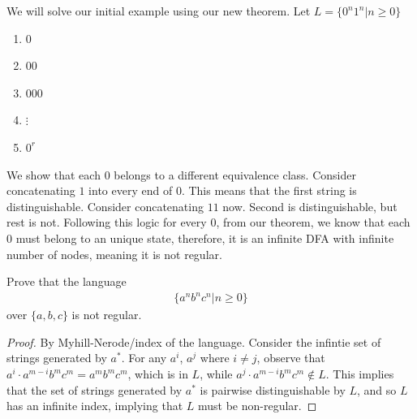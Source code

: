 \documentclass[a4paper]{article}
\theoremstyle{plain}
\theoremstyle{definition}
\newtheorem{exmp}{Example}[section]
\theoremstyle{remark}
\begin{document}
\begin{tcolorbox}[colback=black!3!white,colframe=black!60!white,title=\begin{exmp}Myhill-Nerode Example \label{Myhill-Nerode Example}\end{exmp}]
        We will solve our initial example using our new theorem. Let $L = \{0^{n}1^{n} | n \ge 0 \}$ 
	\begin{enumerate}
		\item $0$ 
		\item $00$ 
		\item $000$ 
		\item $\vdots$
		\item $0^{r}$
	\end{enumerate}
	We show that each $0$ belongs to a different equivalence class. Consider concatenating $1$ into every end of $ 0$. This means that the first string is distinguishable. Consider concatenating  $11$ now. Second is distinguishable, but rest is not. Following this logic for every $0$, from our theorem, we know that each $0$ must belong to an unique state, therefore, it is an infinite DFA with infinite number of nodes, meaning it is not regular.
\end{tcolorbox}
\begin{tcolorbox}[colback=black!3!white,colframe=black!60!white,title=\begin{exmp}Myhill-Nerode Example Two \label{Myhill-Nerode Example Two}\end{exmp}]
        Prove that the language
                \begin{align}
                \{a^{n}b^{n}c^{n} | n\ge 0 \}	
                \end{align}
	over $\{a,b,c\}$ is not regular.
	\begin{proof}
		By Myhill-Nerode/index of the language. Consider the infintie set of strings generated by $a^{*}$. For any $a^{i}$, $a^{j}$ where $i \neq j$, observe that $a^{i}\cdot a^{m-i} b^{m}c^{m}=a^{m}b^{m}c^{m}$, which is in $L$, while $a^{j}\cdot a^{m-i}b^{m}c^{m} \not\in L$. This implies that the set of strings generated by $a^{*}$ is pairwise distinguishable by $L$, and so $L$ has an infinite index, implying that $L$ must be non-regular.
	\end{proof}
\end{tcolorbox}
\end{document}
